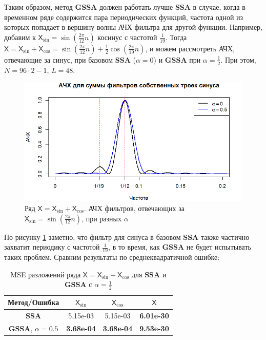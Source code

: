 \documentclass[a4paper, 11pt]{article}
\newcommand{\SSA}{\textbf{SSA}}
\newcommand{\GSSA}{\textbf{GSSA}}
\newcommand{\TS}{\mathsf{X}}
\begin{document}
Таким образом, метод $\GSSA$ должен работать лучше $\SSA$ в случае, когда в временном ряде содержится пара периодических функций, частота одной из которых попадает в вершину волны АЧХ фильтра для другой функции. Например, добавим к $\TS_{\sin} = \sin\left(\frac{2\pi}{12} n \right)$ косинус с частотой $\frac{1}{19}$. Тогда $\TS = \TS_{\sin} + \TS_{\cos} = \sin\left(\frac{2\pi}{12} n \right) + \frac{1}{2}\cos\left(\frac{2\pi}{19} n \right)$, и можем рассмотреть АЧХ, отвечающие за синус, при базовом $\SSA$ ($\alpha = 0$) и $\GSSA$ при $\alpha = \frac{1}{2}$. При этом, $N = 96 \cdot 2 - 1$, $L = 48$.

\begin{figure}[H]
	\centering
	\includegraphics[width=1\textwidth]{img/various_alphas_sin_cos.png}
	\caption{Ряд $\TS = \TS_{\sin} + \TS_{\cos}$. АЧХ фильтров, отвечающих за $\TS_{\sin} = \sin\left(\frac{2\pi}{12} n \right)$, при разных $\alpha$}
	\label{fig:various_alphas_sin_cos}
\end{figure}

По рисунку \ref{fig:various_alphas_sin_cos} заметно, что фильтр для синуса в базовом $\SSA$ также частично захватит периодику с частотой $\frac{1}{19}$, в то время, как $\GSSA$ не будет испытывать таких проблем. Сравним результаты по среднеквадратичной ошибке:

\begin{table}[H]
	\caption{MSE разложений ряда $\TS = \TS_{\sin} + \TS_{\cos}$ для $\SSA$ и $\GSSA$ с $\alpha = \frac{1}{2}$}
	\centering
	\begin{tabular}{c|ccc}
		\hline
		Метод/Ошибка                  & $\TS_{\sin}$      & $\TS_{\cos}$      & $\TS$             \\
		\hline
		\textbf{SSA}                  & 5.15e-03          & 5.15e-03          & \textbf{6.01e-30} \\
		\textbf{GSSA}, $\alpha = 0.5$ & \textbf{3.68e-04} & \textbf{3.68e-04} & \textbf{9.53e-30} \\
		\hline
	\end{tabular}

	\label{tab:mse_ssa_gssa}
\end{table}
\end{document}
